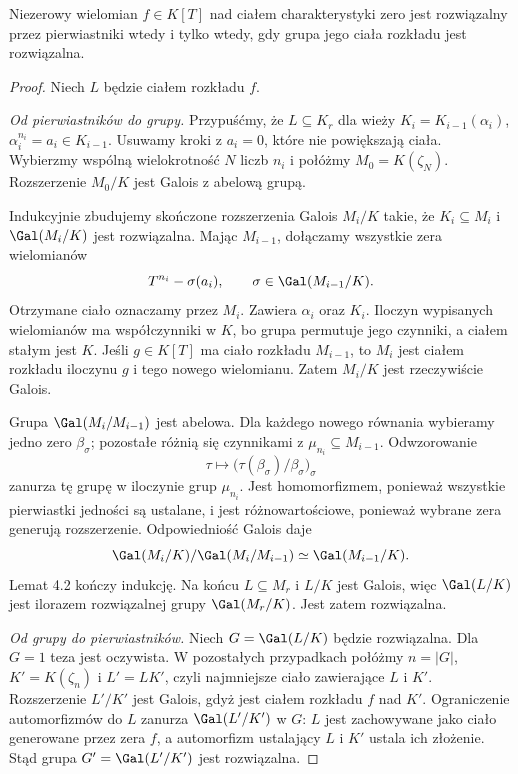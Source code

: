 \begin{twierdzenie}
Niezerowy wielomian $f\in K[T]$ nad ciałem charakterystyki zero jest rozwiązalny przez pierwiastniki wtedy i tylko wtedy, gdy grupa jego ciała rozkładu jest rozwiązalna.
\end{twierdzenie}
\begin{proof}
Niech $L$ będzie ciałem rozkładu $f$.

\emph{Od pierwiastników do grupy.} Przypuśćmy, że $L\subseteq K_r$ dla wieży $K_i=K_{i-1}(\alpha_i)$, $\alpha_i^{n_i}=a_i\in K_{i-1}$. Usuwamy kroki z $a_i=0$, które nie powiększają ciała. Wybierzmy wspólną wielokrotność $N$ liczb $n_i$ i połóżmy $M_0=K(\zeta_N)$. Rozszerzenie $M_0/K$ jest Galois z abelową grupą.

Indukcyjnie zbudujemy skończone rozszerzenia Galois $M_i/K$ takie, że $K_i\subseteq M_i$ i $\Gal(M_i/K)$ jest rozwiązalna. Mając $M_{i-1}$, dołączamy wszystkie zera wielomianów
\[
T^{n_i}-\sigma(a_i),\qquad \sigma\in\Gal(M_{i-1}/K).
\]
Otrzymane ciało oznaczamy przez $M_i$. Zawiera $\alpha_i$ oraz $K_i$. Iloczyn wypisanych wielomianów ma współczynniki w $K$, bo grupa permutuje jego czynniki, a ciałem stałym jest $K$. Jeśli $g\in K[T]$ ma ciało rozkładu $M_{i-1}$, to $M_i$ jest ciałem rozkładu iloczynu $g$ i tego nowego wielomianu. Zatem $M_i/K$ jest rzeczywiście Galois.

Grupa $\Gal(M_i/M_{i-1})$ jest abelowa. Dla każdego nowego równania wybieramy jedno zero $\beta_\sigma$; pozostałe różnią się czynnikami z $\mu_{n_i}\subseteq M_{i-1}$. Odwzorowanie
\[
\tau\longmapsto\bigl(\tau(\beta_\sigma)/\beta_\sigma\bigr)_\sigma
\]
zanurza tę grupę w iloczynie grup $\mu_{n_i}$. Jest homomorfizmem, ponieważ wszystkie pierwiastki jedności są ustalane, i jest różnowartościowe, ponieważ wybrane zera generują rozszerzenie. Odpowiedniość Galois daje
\[
\Gal(M_i/K)/\Gal(M_i/M_{i-1})\simeq\Gal(M_{i-1}/K).
\]
Lemat 4.2 kończy indukcję. Na końcu $L\subseteq M_r$ i $L/K$ jest Galois, więc $\Gal(L/K)$ jest ilorazem rozwiązalnej grupy $\Gal(M_r/K)$. Jest zatem rozwiązalna.

\emph{Od grupy do pierwiastników.} Niech $G=\Gal(L/K)$ będzie rozwiązalna. Dla $G=1$ teza jest oczywista. W pozostałych przypadkach połóżmy $n=|G|$, $K'=K(\zeta_n)$ i $L'=LK'$, czyli najmniejsze ciało zawierające $L$ i $K'$. Rozszerzenie $L'/K'$ jest Galois, gdyż jest ciałem rozkładu $f$ nad $K'$. Ograniczenie automorfizmów do $L$ zanurza $\Gal(L'/K')$ w $G$: $L$ jest zachowywane jako ciało generowane przez zera $f$, a automorfizm ustalający $L$ i $K'$ ustala ich złożenie. Stąd grupa $G'=\Gal(L'/K')$ jest rozwiązalna.


\end{proof}
